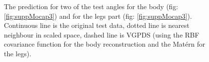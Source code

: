 \begin{figure}[ht]
\begin{center}
\end{center}
\caption{\small{
The prediction for two of the test angles for the body (fig: \ref{fig:suppMocap3}) and for the legs part (fig: \ref{fig:suppMocap3}). Continuous line is the original test data, dotted line is nearest neighbour in scaled space, dashed line is VGPDS (using the RBF covariance function for the body reconstruction and the Mat\'ern for the legs).
}
}
\label{fig:supplMocap2}
\end{figure}




